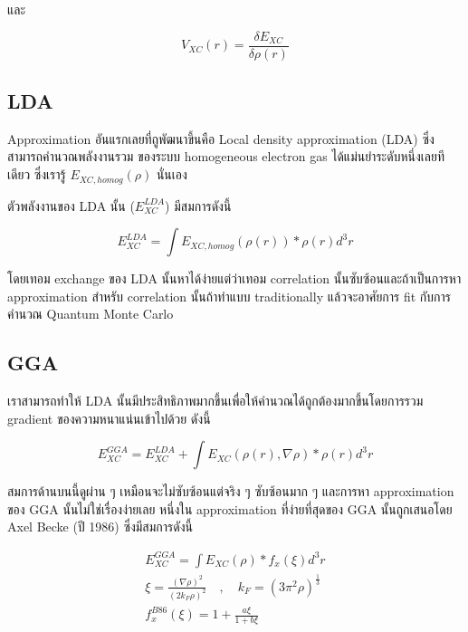\noindent และ

\begin{equation}
    V_{X C}(r) = \frac{\delta E_{X C}}{\delta \rho(r)}
\end{equation}

\subsection{LDA}

Approximation อันแรกเลยที่ถูพัฒนาขึ้นคือ Local density approximation (LDA) ซึ่งสามารถคำนวณพลังงานรวม%
ของระบบ homogeneous electron gas ได้แม่นยำระดับหนึ่งเลยทีเดียว ซึ่งเรารู้ $E_{XC, homog}(\rho)$
นั่นเอง

ตัวพลังงานของ LDA นั้น ($E^{LDA}_{XC}$) มีสมการดังนี้

\begin{equation}
    E^{LDA}_{XC} = \int E_{XC,homog} (\rho(r)) * \rho(r)d^{3}r
\end{equation}

โดยเทอม exchange ของ LDA นั้นหาได้ง่ายแต่ว่าเทอม correlation นั้นซับซ้อนและถ้าเป็นการหา approximation
สำหรับ correlation นั้นถ้าทำแบบ traditionally แล้วจะอาศัยการ fit กับการคำนวณ Quantum Monte Carlo

\subsection{GGA}

เราสามารถทำให้ LDA นั้นมีประสิทธิภาพมากขึ้นเพื่อให้คำนวณได้ถูกต้องมากขึ้นโดยการรวม gradient ของความหนาแน่นเข้าไปด้วย
ดังนี้

\begin{equation}
    E^{GGA}_{XC} = E^{LDA}_{XC} + \int E_{XC} (\rho(r), \nabla\rho) * \rho(r)d^{3}r
\end{equation}

สมการด้านบนนี้ดูผ่าน ๆ เหมือนจะไม่ซับซ้อนแต่จริง ๆ ซับซ้อนมาก ๆ และการหา approximation ของ GGA
นั้นไม่ใช่เรื่องง่ายเลย หนึ่งใน approximation ที่ง่ายที่สุดของ GGA นั้นถูกเสนอโดย Axel Becke (ปี 1986)
ซึ่งมีสมการดังนี้

\begin{gather}
    E^{GGA}_{XC} = \int E_{XC} (\rho) * f_{x}(\xi) d^{3}r \\
    \xi = \frac{(\nabla \rho)^{2}}{(2 k_{F} \rho)^{2}}
    \quad , \quad k_{F} = (3\pi^{2}\rho)^{\frac{1}{3}} \\
    f^{B86}_{x}(\xi) = 1 + \frac{a\xi}{1 + b\xi}
\end{gather}

